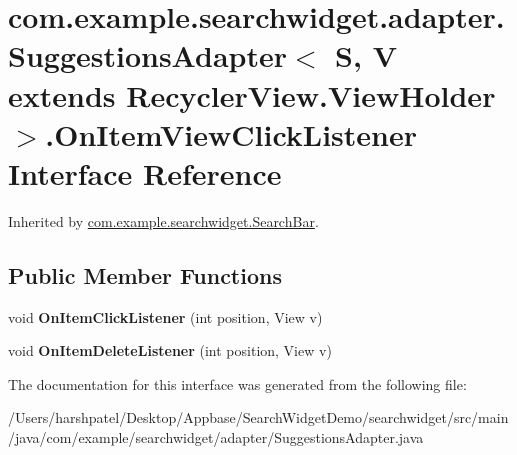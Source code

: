 \hypertarget{interfacecom_1_1example_1_1searchwidget_1_1adapter_1_1_suggestions_adapter_1_1_on_item_view_click_listener}{}\section{com.\+example.\+searchwidget.\+adapter.\+Suggestions\+Adapter$<$ S, V extends Recycler\+View.\+View\+Holder $>$.On\+Item\+View\+Click\+Listener Interface Reference}
\label{interfacecom_1_1example_1_1searchwidget_1_1adapter_1_1_suggestions_adapter_1_1_on_item_view_click_listener}


Inherited by \mbox{\hyperlink{classcom_1_1example_1_1searchwidget_1_1_search_bar}{com.\+example.\+searchwidget.\+Search\+Bar}}.

\subsection*{Public Member Functions}
\begin{DoxyCompactItemize}
\item 
\mbox{\label{interfacecom_1_1example_1_1searchwidget_1_1adapter_1_1_suggestions_adapter_1_1_on_item_view_click_listener_aa0d42ca45d0bbaaa2b7c49fdf9366bb8}} 
void {\bfseries On\+Item\+Click\+Listener} (int position, View v)
\item 
\mbox{\label{interfacecom_1_1example_1_1searchwidget_1_1adapter_1_1_suggestions_adapter_1_1_on_item_view_click_listener_a4edf1e9e364a9069cff26e3c978f505f}} 
void {\bfseries On\+Item\+Delete\+Listener} (int position, View v)
\end{DoxyCompactItemize}


The documentation for this interface was generated from the following file\+:\begin{DoxyCompactItemize}
\item 
/\+Users/harshpatel/\+Desktop/\+Appbase/\+Search\+Widget\+Demo/searchwidget/src/main/java/com/example/searchwidget/adapter/Suggestions\+Adapter.\+java\end{DoxyCompactItemize}
